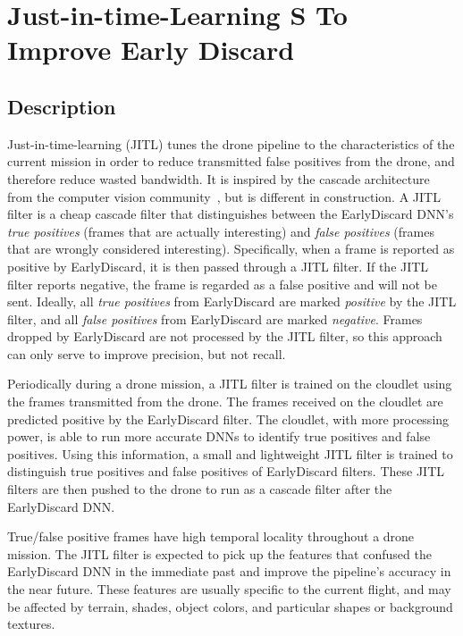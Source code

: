 \section{{\xc Just-in-time-Learning} S To Improve Early Discard}
\label{sec:jitl}

\subsection{Description}

Just-in-time-learning  (JITL) tunes the drone pipeline to the characteristics of
 the current mission in order to reduce transmitted false positives from the
 drone, and therefore reduce wasted bandwidth.  It is inspired by the cascade
 architecture from the computer vision community~\cite{Viola2001}, but is
 different in construction. A JITL filter is a cheap cascade filter that
 distinguishes between the EarlyDiscard DNN's \emph{true positives} (frames that
 are actually interesting) and \emph{false positives} (frames that are wrongly
 considered interesting).  Specifically, when a frame is reported as positive by
 EarlyDiscard, it is then passed through a JITL filter. If the JITL filter
 reports negative, the frame is regarded as a false positive and will not be
 sent. Ideally, all \emph{true positives} from EarlyDiscard are marked
 \emph{positive} by the JITL filter, and all \emph{false positives} from 
 EarlyDiscard are marked \emph{negative}.  Frames dropped by EarlyDiscard are
 not processed by the JITL filter, so this approach can only serve to improve
 precision, but not recall.


Periodically during a drone mission, a JITL filter is trained on the cloudlet
using the frames transmitted from the drone.  The frames received on the
cloudlet are predicted positive by the EarlyDiscard filter. The cloudlet, with
more processing power, is able to run more accurate DNNs to identify true
positives and false positives. Using this information, a small and lightweight
JITL filter is trained to distinguish true positives and false positives of
EarlyDiscard filters. These JITL filters are then pushed to the drone to run as
a cascade filter after the EarlyDiscard DNN.

True/false positive frames have high temporal locality throughout a drone
mission. The JITL filter is expected to pick up the features that confused the
EarlyDiscard DNN in the immediate past and improve the pipeline's accuracy in
the near future. These features are usually specific to the current flight, and
may be affected by terrain, shades, object colors, and particular shapes or
background textures.


